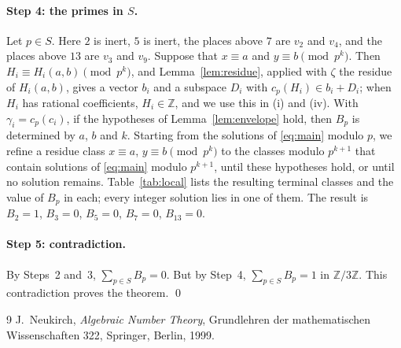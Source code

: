 \documentclass[11pt]{article}
\newcommand{\Z}{\mathbb{Z}}
\begin{document}
\paragraph{Step 4: the primes in $S$.} Let $p\in S$. Here $2$ is inert, $5$ is inert, the places above $7$ are $v_{2}$ and $v_{4}$, and the places above $13$ are $v_{3}$ and $v_{9}$. Suppose that $x\equiv a$ and $y\equiv b\pmod{p^k}$. Then $H_i\equiv H_i(a,b)\pmod{p^k}$, and Lemma~\ref{lem:residue}, applied with $\zeta$ the residue of $H_i(a,b)$, gives a vector $b_i$ and a subspace $D_i$ with $c_p(H_i)\in b_i+D_i$; when $H_i$ has rational coefficients, $H_i\in\Z$, and we use this in (i) and (iv). With $\gamma_i=c_p(c_i)$, if the hypotheses of Lemma~\ref{lem:envelope} hold, then $B_p$ is determined by $a$, $b$ and $k$. Starting from the solutions of \eqref{eq:main} modulo $p$, we refine a residue class $x\equiv a$, $y\equiv b\pmod{p^k}$ to the classes modulo $p^{k+1}$ that contain solutions of \eqref{eq:main} modulo $p^{k+1}$, until these hypotheses hold, or until no solution remains. Table~\ref{tab:local} lists the resulting terminal classes and the value of $B_p$ in each; every integer solution lies in one of them. The result is $B_{2}=1$, $B_{3}=0$, $B_{5}=0$, $B_{7}=0$, $B_{13}=0$.

\paragraph{Step 5: contradiction.} By Steps~2 and~3, $\sum_{p\in S}B_p=0$. But by Step~4, $\sum_{p\in S}B_p=1$ in $\Z/3\Z$. This contradiction proves the theorem.
\qed


\begin{thebibliography}{9}
 J.~Neukirch, \emph{Algebraic Number Theory}, Grundlehren der mathematischen Wissenschaften 322, Springer, Berlin, 1999.
\end{thebibliography}
\end{document}

